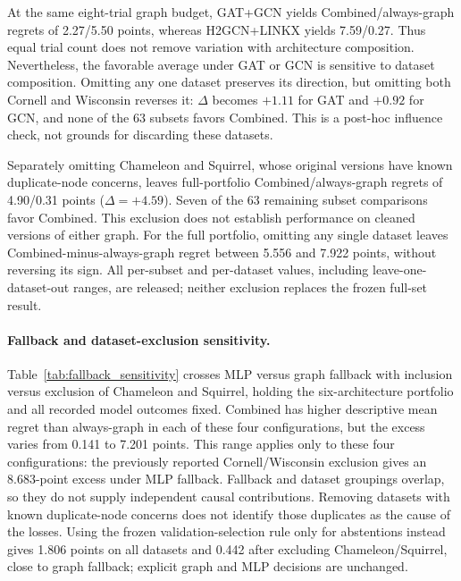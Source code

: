 At the same eight-trial graph budget, GAT+GCN yields Combined/always-graph regrets of 2.27/5.50 points, whereas H2GCN+LINKX yields 7.59/0.27. Thus equal trial count does not remove variation with architecture composition. Nevertheless, the favorable average under GAT or GCN is sensitive to dataset composition. Omitting any one dataset preserves its direction, but omitting both Cornell and Wisconsin reverses it: $\Delta$ becomes $+1.11$ for GAT and $+0.92$ for GCN, and none of the 63 subsets favors Combined. This is a post-hoc influence check, not grounds for discarding these datasets.

Separately omitting Chameleon and Squirrel, whose original versions have known duplicate-node concerns, leaves full-portfolio Combined/always-graph regrets of 4.90/0.31 points ($\Delta=+4.59$). Seven of the 63 remaining subset comparisons favor Combined. This exclusion does not establish performance on cleaned versions of either graph. For the full portfolio, omitting any single dataset leaves Combined-minus-always-graph regret between 5.556 and 7.922 points, without reversing its sign. All per-subset and per-dataset values, including leave-one-dataset-out ranges, are released; neither exclusion replaces the frozen full-set result.

\paragraph{Fallback and dataset-exclusion sensitivity.}
Table~\ref{tab:fallback_sensitivity} crosses MLP versus graph fallback with inclusion versus exclusion of Chameleon and Squirrel, holding the six-architecture portfolio and all recorded model outcomes fixed. Combined has higher descriptive mean regret than always-graph in each of these four configurations, but the excess varies from 0.141 to 7.201 points. This range applies only to these four configurations: the previously reported Cornell/Wisconsin exclusion gives an 8.683-point excess under MLP fallback. Fallback and dataset groupings overlap, so they do not supply independent causal contributions. Removing datasets with known duplicate-node concerns does not identify those duplicates as the cause of the losses. Using the frozen validation-selection rule only for abstentions instead gives 1.806 points on all datasets and 0.442 after excluding Chameleon/Squirrel, close to graph fallback; explicit graph and MLP decisions are unchanged.

